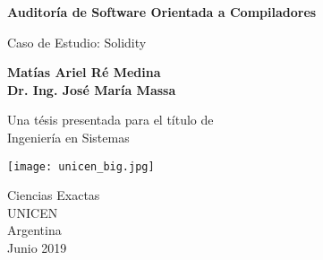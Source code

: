 \begin{titlepage}
    \begin{center}
        \vspace*{1cm}
 
        \Large
        \textbf{Auditoría de Software Orientada a Compiladores}
 
        \vspace{0.3cm}
        \Large
        {Caso de Estudio: Solidity}
 
        \vspace{1.5cm}
        
        \large
        \textbf{{Matías Ariel Ré Medina}\\
        {Dr. Ing. José María Massa}
        }
 
        \vfill
 
        Una tésis presentada para el título de\\
        Ingeniería en Sistemas
 
        \vspace{0.8cm}
 
        {\texttt{[image: unicen\_big.jpg]}}
        \vspace*{0.3cm}

        \large
        Ciencias Exactas\\
        UNICEN\\
        Argentina\\
        Junio 2019
 
    \end{center}
\end{titlepage}